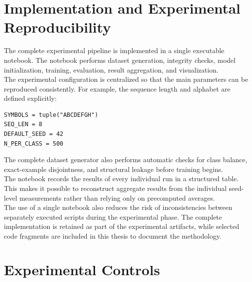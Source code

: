 \section{Implementation and Experimental Reproducibility}

\noindent
The complete experimental pipeline is implemented in a single executable notebook. The notebook performs dataset generation, integrity checks, model initialization, training, evaluation, result aggregation, and visualization.
\\
The experimental configuration is centralized so that the main parameters can be reproduced consistently. For example, the sequence length and alphabet are defined explicitly:

\begin{verbatim}
SYMBOLS = tuple("ABCDEFGH")
SEQ_LEN = 8
DEFAULT_SEED = 42
N_PER_CLASS = 500
\end{verbatim}

\noindent
The complete dataset generator also performs automatic checks for class balance, exact-example disjointness, and structural leakage before training begins.
\\
The notebook records the results of every individual run in a structured table. This makes it possible to reconstruct aggregate results from the individual seed-level measurements rather than relying only on precomputed averages.
\\
The use of a single notebook also reduces the risk of inconsistencies between separately executed scripts during the experimental phase. The complete implementation is retained as part of the experimental artifacts, while selected code fragments are included in this thesis to document the methodology.

\section{Experimental Controls}

